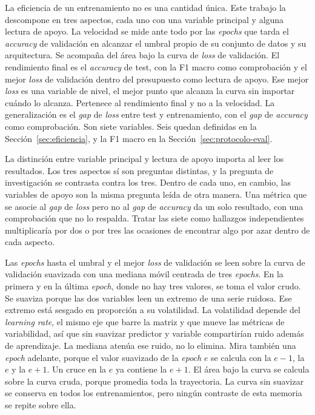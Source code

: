 La eficiencia de un entrenamiento no es una cantidad única. Este trabajo la descompone en tres aspectos, cada uno con una variable principal y alguna lectura de apoyo. La velocidad se mide ante todo por las \emph{epochs} que tarda el \emph{accuracy} de validación en alcanzar el umbral propio de su conjunto de datos y su arquitectura. Se acompaña del área bajo la curva de \emph{loss} de validación. El rendimiento final es el \emph{accuracy} de test, con la F1 macro como comprobación y el mejor \emph{loss} de validación dentro del presupuesto como lectura de apoyo. Ese mejor \emph{loss} es una variable de nivel, el mejor punto que alcanza la curva sin importar cuándo lo alcanza. Pertenece al rendimiento final y no a la velocidad. La generalización es el \emph{gap} de \emph{loss} entre test y entrenamiento, con el \emph{gap} de \emph{accuracy} como comprobación. Son siete variables. Seis quedan definidas en la Sección~\ref{sec:eficiencia}, y la F1 macro en la Sección~\ref{sec:protocolo-eval}.

La distinción entre variable principal y lectura de apoyo importa al leer los resultados. Los tres aspectos sí son preguntas distintas, y la pregunta de investigación se contrasta contra los tres. Dentro de cada uno, en cambio, las variables de apoyo son la misma pregunta leída de otra manera. Una métrica que se asocie al \emph{gap} de \emph{loss} pero no al \emph{gap} de \emph{accuracy} da un solo resultado, con una comprobación que no lo respalda. Tratar las siete como hallazgos independientes multiplicaría por dos o por tres las ocasiones de encontrar algo por azar dentro de cada aspecto.

Las \emph{epochs} hasta el umbral y el mejor \emph{loss} de validación se leen sobre la curva de validación suavizada con una mediana móvil centrada de tres \emph{epochs}. En la primera y en la última \emph{epoch}, donde no hay tres valores, se toma el valor crudo. Se suaviza porque las dos variables leen un extremo de una serie ruidosa. Ese extremo está sesgado en proporción a su volatilidad. La volatilidad depende del \emph{learning rate}, el mismo eje que barre la matriz y que mueve las métricas de variabilidad, así que sin suavizar predictor y variable compartirían ruido además de aprendizaje. La mediana atenúa ese ruido, no lo elimina. Mira también una \emph{epoch} adelante, porque el valor suavizado de la \emph{epoch} $e$ se calcula con la $e - 1$, la $e$ y la $e + 1$. Un cruce en la $e$ ya contiene la $e + 1$. El área bajo la curva se calcula sobre la curva cruda, porque promedia toda la trayectoria. La curva sin suavizar se conserva en todos los entrenamientos, pero ningún contraste de esta memoria se repite sobre ella.

